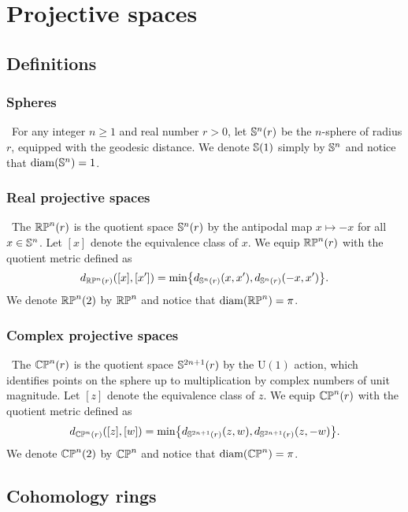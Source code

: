 
\section{Projective spaces}


\subsection{Definitions}

\subsubsection{Spheres}\
For any integer $n \geq 1$ and real number $r > 0$, let $\bS^n(r)$ be the $n$-sphere of radius $r$, equipped with the geodesic distance.
We denote $\bS(1)$ simply by $\bS^n$ and notice that $\diam(\bS^n) = 1$.

\subsubsection{Real projective spaces}\
The  $\rp^n(r)$ is the quotient space $\bS^n(r)$ by the antipodal map $x \mapsto -x$ for all $x \in \bS^n$.
Let $[x]$ denote the equivalence class of $x$.
We equip $\rp^n(r)$ with the quotient metric defined as
\[
d_{\rp^n(r)}([x],[x']) =
\min\set[\big]{d_{\bS^n(r)}(x, x'), d_{\bS^n(r)}(-x, x')}.
\]
We denote $\rp^n(2)$ by $\rp^n$ and notice that $\diam(\rp^n) = \pi$.

\subsubsection{Complex projective spaces}\
The  $\cp^n(r)$ is the quotient space $\bS^{2n+1}(r)$ by the \( \text{U}(1) \) action, which identifies points on the sphere up to multiplication by complex numbers of unit magnitude.
Let $[z]$ denote the equivalence class of $z$.
We equip $\cp^n(r)$ with the quotient metric defined as
\[
d_{\cp^n(r)}([z],[w]) =
\min\set[\big]{d_{\bS^{2n+1}(r)}(z, w), d_{\bS^{2n+1}(r)}(z, -w)}.
\]
We denote $\cp^n(2)$ by $\cp^n$ and notice that $\diam(\cp^n) = \pi$.

\subsection{Cohomology rings}

